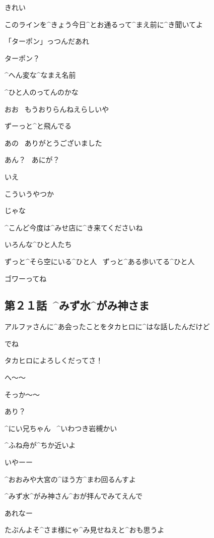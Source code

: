\Alpha きれい

\Ayase このラインを^{きょう}{今日}^{とお}{通}るって^{まえ}{前}に^{き}{聞}いてよ

\page[77]
\Ayase 「ターポン」っつんだあれ

\Alpha ターポン？

\Alpha ^{へん}{変}な^{なまえ}{名前}

\Alpha ^{ひと}{人}のってんのかな

\Ayase おお
\ もうおりらんねえらしいや

\Ayase ずーっと^{と}{飛}んでる

\page[80]
\Alpha あの
\ ありがとうございました

\Ayase あん？
\ あにが？

\Alpha いえ

\Ayase こういうやつか

\page[81]
\Ayase じゃな

\Alpha ^{こんど}{今度}は^{みせ}{店}に^{き}{来}てくださいね

\page[82]
\Alpha いろんな^{ひと}{人}たち

\Alpha ずっと^{そら}{空}にいる^{ひと}{人}
\ ずっと^{ある}{歩}いてる^{ひと}{人}

\Alpha ゴワーってね


\subsection{第２１話\ ^{みず}{水}^{がみ}{神}さま}

\page[84]
\Narrator アルファさんに^{あ}{会}ったことをタカヒロに^{はな}{話}したんだけど

\page[85]
\Alpha でね

\Alpha タカヒロによろしくだってさ！

\Takahiro へ〜〜

\Takahiro そっか〜〜

\Alpha あり？

\page[86]
\Person ^{にい}{兄}ちゃん
\ ^{いわつき}{岩槻}かい

\Person ^{ふね}{舟}が^{ちか}{近}いよ

\Ayase いやーー

\Ayase ^{おおみや}{大宮}の^{ほう}{方}^{まわ}{回}るんすよ

\Ayase ^{みず}{水}^{がみ}{神}さん^{おが}{拝}んでみてえんで

\page[87]
\Person あれなー

\Person たぶんよそ^{さま}{様}にゃ^{み}{見}せねえと^{おも}{思}うよ

